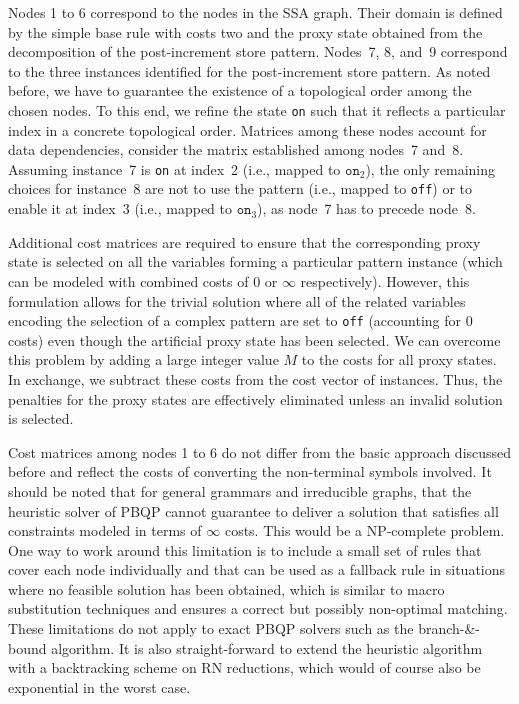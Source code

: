 Nodes 1 to 6 correspond to the nodes in the SSA graph. Their
domain is defined by the simple base rule with costs two and the proxy
state obtained from the decomposition of the post-increment store
pattern. Nodes~7, 8, and~9 correspond to the three instances
identified for the post-increment store pattern. As noted before, we
have to guarantee the existence of a topological order among the
chosen nodes. To this end, we refine the state \texttt{on} such that it
reflects a particular index in a concrete topological order. Matrices
among these nodes account for data dependencies, \eg consider the
matrix established among nodes~7 and~8. Assuming instance~7 is
\texttt{on} at index~2 (i.e., mapped to $\texttt{on}_2$), the only remaining choices for instance~8 are
not to use the pattern (i.e., mapped to \texttt{off}) or to enable it at index~3 (i.e., mapped to $\texttt{on}_3$), as node~7 has
to precede node~8.

Additional cost matrices are required to ensure that the corresponding
proxy state is selected on all the variables forming a particular
pattern instance (which can be modeled with combined costs of 0 or
$\infty$ respectively). However, this formulation allows for the
trivial solution where all of the related variables encoding the
selection of a complex pattern are set to \texttt{off} (accounting for
0 costs) even though the artificial proxy state has been selected. We
can overcome this problem by adding a large integer value $M$ to the
costs for all proxy states. In exchange, we subtract these costs from
the cost vector of instances. Thus, the penalties for the proxy states
are effectively eliminated unless an invalid solution is selected.

Cost matrices among nodes 1 to 6 do not differ from the basic
approach discussed before and reflect the costs of converting the
non-terminal symbols involved.  It should be noted that for general
grammars and irreducible graphs, that the heuristic solver of PBQP
cannot guarantee to deliver a solution that satisfies all constraints
modeled in terms of $\infty$ costs. This would be a NP-complete
problem. One way to work around this limitation is to include a small
set of rules that cover each node individually and that can be used as
a fallback rule in situations where no feasible solution has been
obtained, which is similar to macro substitution techniques and
ensures a correct but possibly non-optimal matching. These limitations
do not apply to exact PBQP solvers such as the branch-\&-bound
algorithm. It is also straight-forward to extend the heuristic
algorithm with a backtracking scheme on RN reductions, which would of
course also be exponential in the worst case.

